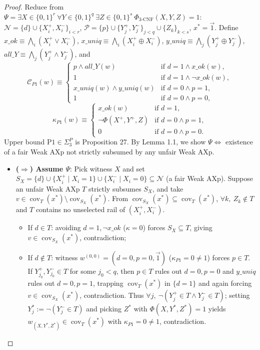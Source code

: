 \documentclass[11pt,a4paper]{article}
\newcommand{\C}{\mathcal{C}}
\newcommand{\N}{\mathcal{N}}
\newcommand{\Prot}{\mathcal{P}}
\newcommand{\cov}{\operatorname{cov}}
\begin{document}
\begin{proof}
Reduce from $\Psi = \exists X \in \{0,1\}^r\ \forall Y \in \{0,1\}^q\ \exists Z \in \{0,1\}^s\ \Phi_{\text{3-CNF}}(X,Y,Z)=1$:
$\N = \{d\} \cup \{X_i^+, X_i^-\}_{i<r}$, $\Prot = \{p\} \cup \{Y_j^+, Y_j^-\}_{j<q} \cup \{Z_k\}_{k<s}$, $x^* = \vec{1}$. Define $x\_ok \equiv \bigwedge_i (X_i^+ \lor X_i^-)$, $x\_uniq \equiv \bigwedge_i (X_i^+ \oplus X_i^-)$, $y\_uniq \equiv \bigwedge_j (Y_j^+ \oplus Y_j^-)$, $all\_Y \equiv \bigwedge_j (Y_j^+ \land Y_j^-)$, and
\[
  \C_{P1}(w) \equiv \begin{cases}
    p \land all\_Y(w) & \text{if } d=1 \land x\_ok(w),\\
    1 & \text{if } d=1 \land \neg x\_ok(w),\\
    x\_uniq(w) \land y\_uniq(w) & \text{if } d=0 \land p=1,\\
    1 & \text{if } d=0 \land p=0,
  \end{cases}
\]
\[
  \kappa_{P1}(w) \equiv \begin{cases}
    x\_ok(w) & \text{if } d=1,\\
    \neg\Phi(X^+,Y^+,Z) & \text{if } d=0 \land p=1,\\
    0 & \text{if } d=0 \land p=0.
  \end{cases}
\]
Upper bound $\mathrm{P1} \in \Sigma_3^P$ is Proposition 27. By Lemma 1.1, we show $\Psi \iff$ existence of a fair Weak AXp not strictly subsumed by any unfair Weak AXp.
\begin{itemize}
  \item \textbf{($\Rightarrow$) Assume $\Psi$}: Pick witness $X$ and set $S_X = \{d\} \cup \{X_i^+ \mid X_i=1\} \cup \{X_i^- \mid X_i=0\} \subseteq \N$ (a fair Weak AXp). Suppose an unfair Weak AXp $T$ strictly subsumes $S_X$, and take $v \in \cov_T(x^*) \setminus \cov_{S_X}(x^*)$. From $\cov_{S_X}(x^*) \subseteq \cov_T(x^*)$, $\forall k,\ Z_k \notin T$ and $T$ contains no unselected rail of $(X_i^+, X_i^-)$.
  \begin{itemize}
    \item If $d \in T$: avoiding $d=1, \neg x\_ok$ ($\kappa=0$) forces $S_X \subseteq T$, giving $v \in \cov_{S_X}(x^*)$, contradiction;
    \item If $d \notin T$: witness $w^{(0,0)} = (d=0, p=0, \vec{1})$ ($\kappa_{P1}=0 \ne 1$) forces \textbf{$p \in T$}. If $Y_{j_0}^+, Y_{j_0}^- \in T$ for some $j_0 < q$, then $p \in T$ rules out $d=0,p=0$ and $y\_uniq$ rules out $d=0,p=1$, trapping $\cov_T(x^*)$ in $\{d=1\}$ and again forcing $v \in \cov_{S_X}(x^*)$, contradiction. Thus $\forall j,\ \neg(Y_j^+ \in T \land Y_j^- \in T)$; setting $Y^*_j := \neg(Y_j^- \in T)$ and picking $Z^*$ with $\Phi(X,Y^*,Z^*)=1$ yields $w_{(X,Y^*,Z^*)} \in \cov_T(x^*)$ with $\kappa_{P1}=0 \ne 1$, contradiction.

\end{itemize}
\end{itemize}
\end{proof}
\end{document}
